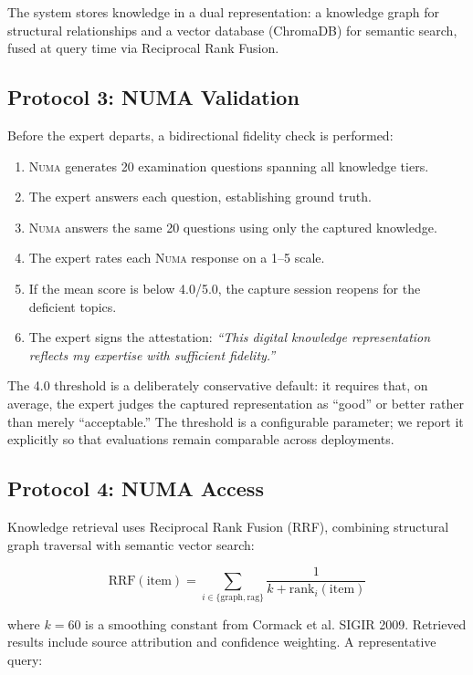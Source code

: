 \documentclass[11pt,a4paper]{article}
\begin{document}
The system stores knowledge in a dual representation: a knowledge graph for structural relationships and a vector database (ChromaDB) for semantic search, fused at query time via Reciprocal Rank Fusion.

\subsection{Protocol 3: NUMA Validation}

Before the expert departs, a bidirectional fidelity check is performed:

\begin{enumerate}
    \item \textsc{Numa} generates 20 examination questions spanning all knowledge tiers.
    \item The expert answers each question, establishing ground truth.
    \item \textsc{Numa} answers the same 20 questions using only the captured knowledge.
    \item The expert rates each \textsc{Numa} response on a 1--5 scale.
    \item If the mean score is below 4.0/5.0, the capture session reopens for the deficient topics.
    \item The expert signs the attestation: {\it ``This digital knowledge representation reflects my expertise with sufficient fidelity.''}
\end{enumerate}

The 4.0 threshold is a deliberately conservative default: it requires that, on average, the expert judges the captured representation as ``good'' or better rather than merely ``acceptable.'' The threshold is a configurable parameter; we report it explicitly so that evaluations remain comparable across deployments.

\subsection{Protocol 4: NUMA Access}

Knowledge retrieval uses Reciprocal Rank Fusion (RRF), combining structural graph traversal with semantic vector search:

\begin{equation}
\text{RRF}(\text{item}) = \sum_{i \in \{\text{graph}, \text{rag}\}} \frac{1}{k + \text{rank}_i(\text{item})}
\label{eq:rrf}
\end{equation}

where $k = 60$ is a smoothing constant from Cormack et al. SIGIR 2009. Retrieved results include source attribution and confidence weighting. A representative query:
\end{document}
